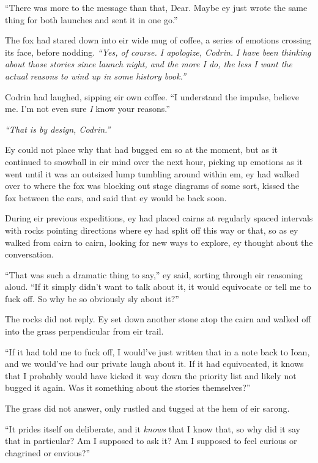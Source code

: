 ``There was more to the message than that, Dear. Maybe ey just wrote the same thing for both launches and sent it in one go.''

The fox had stared down into eir wide mug of coffee, a series of emotions crossing its face, before nodding. \emph{``Yes, of course. I apologize, Codrin. I have been thinking about those stories since launch night, and the more I do, the less I want the actual reasons to wind up in some history book.''}

Codrin had laughed, sipping eir own coffee. ``I understand the impulse, believe me. I'm not even sure \emph{I} know your reasons.''

\emph{``That is by design, Codrin.''}

Ey could not place why that had bugged em so at the moment, but as it continued to snowball in eir mind over the next hour, picking up emotions as it went until it was an outsized lump tumbling around within em, ey had walked over to where the fox was blocking out stage diagrams of some sort, kissed the fox between the ears, and said that ey would be back soon.

During eir previous expeditions, ey had placed cairns at regularly spaced intervals with rocks pointing directions where ey had split off this way or that, so as ey walked from cairn to cairn, looking for new ways to explore, ey thought about the conversation.

``That was such a dramatic thing to say,'' ey said, sorting through eir reasoning aloud. ``If it simply didn't want to talk about it, it would equivocate or tell me to fuck off. So why be so obviously sly about it?''

The rocks did not reply. Ey set down another stone atop the cairn and walked off into the grass perpendicular from eir trail.

``If it had told me to fuck off, I would've just written that in a note back to Ioan, and we would've had our private laugh about it. If it had equivocated, it knows that I probably would have kicked it way down the priority list and likely not bugged it again. Was it something about the stories themselves?''

The grass did not answer, only rustled and tugged at the hem of eir sarong.

``It prides itself on deliberate, and it \emph{knows} that I know that, so why did it say that in particular? Am I supposed to ask it? Am I supposed to feel curious or chagrined or envious?''

